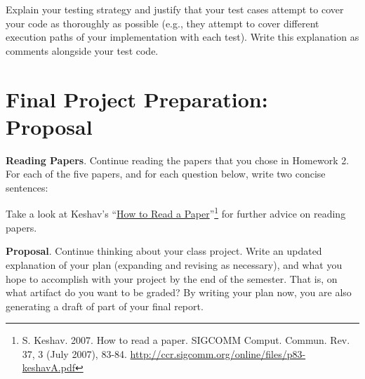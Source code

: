 \documentclass[12pt]{exam}
\begin{document}
Explain your testing strategy and justify that your test cases attempt to cover your code as thoroughly as possible (e.g., they attempt to cover different execution paths of your implementation with each test). Write this explanation as comments alongside your test code.

\section{Final Project Preparation: Proposal}

\begin{questions}
  \question \textbf{Reading Papers}. Continue reading the papers that you chose in Homework 2. For each of the five papers, and for each question below, write two concise sentences:
  Take a look at Keshav's ``\href{http://ccr.sigcomm.org/online/files/p83-keshavA.pdf}{How to Read a Paper}''\footnote{S. Keshav. 2007. How to read a paper. SIGCOMM Comput. Commun. Rev. 37, 3 (July 2007), 83-84. \url{http://ccr.sigcomm.org/online/files/p83-keshavA.pdf}} for further advice on reading papers.
  
  \question
\textbf{Proposal}. Continue thinking about your class project.
%
Write an updated explanation of your plan (expanding and revising as necessary), and what you hope to accomplish with your project by the end of the semester. That is, on what artifact do you want to be graded? By writing your plan now, you are also generating a draft of part of your final report.


\end{questions}
\end{document}
